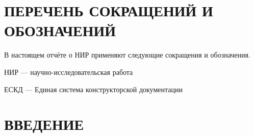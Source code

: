 \section*{ПЕРЕЧЕНЬ СОКРАЩЕНИЙ И ОБОЗНАЧЕНИЙ}

В настоящем отчёте о НИР применяют следующие сокращения и обозначения.

НИР — научно-исследовательская работа

ЕСКД — Единая система конструкторской документации %

\section*{ВВЕДЕНИЕ}
